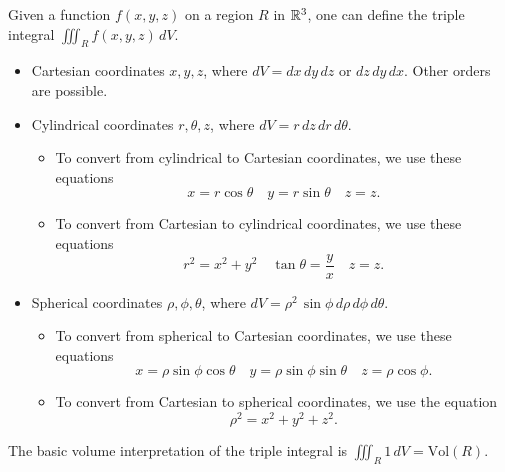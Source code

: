 \begin{definition}
	Given a function $f(x, y, z)$ on a region $R$ in ${\mathbb{R}}^3$, one can define the
	triple integral $\iiint_R f(x, y, z)\, dV$.
	\begin{itemize}
		\item Cartesian coordinates $x, y, z$, where $dV = dx\, dy\, dz$ or $dz\,
			dy\, dx$. Other orders are possible.
		\item  Cylindrical coordinates $r, \theta, z$, where $dV = r\, dz\, dr\,
			d\theta$.
			\begin{itemize}
				\item To convert from cylindrical to Cartesian coordinates, we use these
					equations
					\[
						x = r \cos\theta \quad y = r \sin\theta \quad z = z.
					\]
				\item To convert from Cartesian to cylindrical coordinates, we use these
					equations
					\[
						r^2 = x^2 + y^2 \quad \tan\theta = \frac{y}{x} \quad z = z.
					\]
			\end{itemize}
		\item Spherical coordinates $\rho, \phi, \theta$, where $dV = \rho^2\,
			\sin\phi\, d\rho\, d\phi\, d\theta$.
			\begin{itemize}
				\item To convert from spherical to Cartesian coordinates, we use these
					equations
					\[
						x = \rho \sin\phi \cos\theta \quad y = \rho \sin\phi \sin\theta
						\quad z = \rho \cos\phi.
					\]
				\item To convert from Cartesian to spherical coordinates, we use the
					equation
					\[
						\rho^2 = x^2 + y^2 + z^2.
					\]
			\end{itemize}
	\end{itemize}
\end{definition}

\begin{definition}
	The basic volume interpretation of the triple integral is $\iiint_R 1\, dV =
	\text{Vol}(R)$.
\end{definition}
